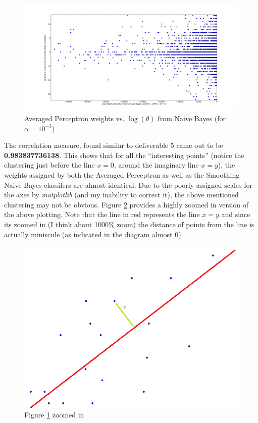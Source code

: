 \documentclass[10pt, letter]{article}
\begin{document}
\begin{figure}
  \centering
    \includegraphics[scale=0.25]{images/deliverable_10}
    \caption{Averaged Perceptron weights vs. $\log(\theta)$ from Naive Bayes (for $\alpha = 10^{-3}$)}
  \label{del10}
\end{figure}

The correlation measure, found similar to deliverable 5 came out to be \textbf{0.983837736138}. This shows that for all the ``interesting points'' (notice the clustering just before the line $x=0$, around the imaginary line $x=y$), the weights assigned by both the Averaged Perceptron as well as the Smoothing Naive Bayes classifers are almost identical. Due to the poorly assigned scales for the axes by \textit{matplotlib} (and my inability to correct it), the above mentioned clustering may not be obvious. Figure \ref{del11} provides a highly zoomed in version of the above plotting. Note that the line in red represents the line $x=y$ and since its zoomed in (I think about 1000\% zoom) the distance of points from the line is actually miniscule (as indicated in the diagram almost 0).

\begin{figure}
  \centering
    \includegraphics[scale=0.25]{images/deliverable_10_1}
    \caption{Figure \ref{del10} zoomed in}
  \label{del11}
\end{figure}
\end{document}
